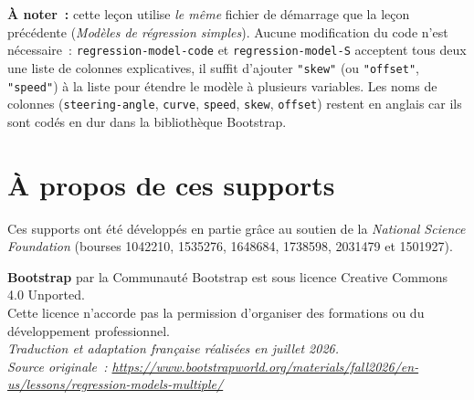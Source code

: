 \documentclass[12pt,a4paper]{article}
\begin{document}
\vspace{1em}
\textbf{À noter~:} cette leçon utilise \emph{le même} fichier de démarrage que la leçon précédente (\emph{Modèles de régression simples}). Aucune modification du code n'est nécessaire~: \texttt{regression\allowbreak-model\allowbreak-code} et \texttt{regression\allowbreak-model\allowbreak-S} acceptent tous deux une liste de colonnes explicatives, il suffit d'ajouter \texttt{"skew"} (ou \texttt{"offset"}, \texttt{"speed"}) à la liste pour étendre le modèle à plusieurs variables. Les noms de colonnes (\texttt{steering-angle}, \texttt{curve}, \texttt{speed}, \texttt{skew}, \texttt{offset}) restent en anglais car ils sont codés en dur dans la bibliothèque Bootstrap.

\section*{À propos de ces supports}

Ces supports ont été développés en partie grâce au soutien de la \emph{National Science Foundation} (bourses 1042210, 1535276, 1648684, 1738598, 2031479 et 1501927).

\begin{center}
  \textbf{Bootstrap} par la Communauté Bootstrap est sous licence Creative Commons 4.0 Unported.\\
  Cette licence n'accorde pas la permission d'organiser des formations ou du développement professionnel.\\[1em]
  \textit{Traduction et adaptation française réalisées en juillet 2026.}\\
  \textit{Source originale~: \url{https://www.bootstrapworld.org/materials/fall2026/en-us/lessons/regression-models-multiple/}}
\end{center}
\end{document}
